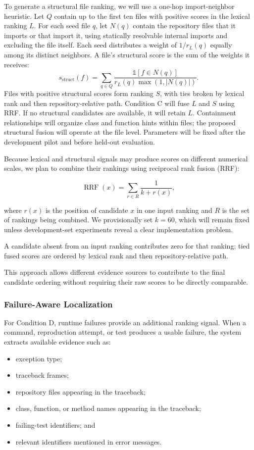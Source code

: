 \documentclass[11pt]{article}
\begin{document}
To generate a structural file ranking, we will use a one-hop
import-neighbor heuristic. Let $Q$ contain up to the first ten files
with positive scores in the lexical ranking $L$. For each seed file
$q$, let $N(q)$ contain the repository files that it imports or that
import it, using statically resolvable internal imports and excluding
the file itself. Each seed distributes a weight of $1/r_L(q)$ equally
among its distinct neighbors. A file's structural score is the sum of
the weights it receives:
\[
s_{\mathrm{struct}}(f)
= \sum_{q\in Q}
\frac{\mathbb{1}[f\in N(q)]}
{r_L(q)\max(1,|N(q)|)}.
\]
Files with positive structural scores form ranking $S$, with ties
broken by lexical rank and then repository-relative path. Condition C
will fuse $L$ and $S$ using RRF. If no structural candidates are
available, it will retain $L$. Containment relationships will organize
class and function hints within files; the proposed structural fusion
will operate at the file level. Parameters will be fixed after the
development pilot and before held-out evaluation.

Because lexical and structural signals may produce scores on different
numerical scales, we plan to combine their rankings using reciprocal rank
fusion (RRF):

\[
\operatorname{RRF}(x)
=
\sum_{r \in R}
\frac{1}{k + r(x)},
\]

where $r(x)$ is the position of candidate $x$ in one input ranking and
$R$ is the set of rankings being combined. We provisionally set
$k=60$, which will remain fixed unless development-set experiments reveal
a clear implementation problem.

A candidate absent from an input ranking contributes zero for that
ranking; tied fused scores are ordered by lexical rank and then
repository-relative path.

This approach allows different evidence sources to contribute to the final
candidate ordering without requiring their raw scores to be directly
comparable.


\subsubsection*{Failure-Aware Localization}

For Condition D, runtime failures provide an additional ranking signal.
When a command, reproduction attempt, or test produces a usable failure,
the system extracts available evidence such as:

\begin{itemize}[leftmargin=*, itemsep=0.25em]
    \item exception type;
    \item traceback frames;
    \item repository files appearing in the traceback;
    \item class, function, or method names appearing in the traceback;
    \item failing-test identifiers; and
    \item relevant identifiers mentioned in error messages.
\end{itemize}
\end{document}
